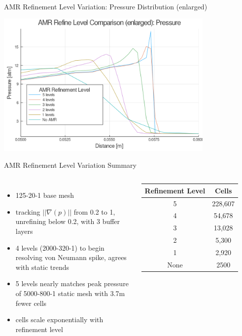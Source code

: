 \begin{frame}{AMR Refinement Level Variation: Pressure Distribution (enlarged)}
\begin{center}
\includegraphics[width=0.8\textwidth]{../figs/amrfigs/amr_refinelevels/pe.png}
\end{center}
\end{frame}


\begin{frame}{AMR Refinement Level Variation Summary}
\begin{columns}
\begin{itemize}
\item 125-20-1 base mesh
\item tracking $||\nabla (p)||$ from 0.2 to 1, unrefining below 0.2, with 3 buffer layers
\item 4 levels (2000-320-1) to begin resolving von Neumann spike, agrees with static trends
\item 5 levels nearly matches peak pressure of 5000-800-1 static mesh with 3.7m fewer cells
\item cells scale exponentially with refinement level
\end{itemize}

\begin{table}[h]
\centering
\begin{tabular}{cc}
Refinement Level & Cells \\ \hline
5 & 228,607 \\ 
4 & 54,678 \\ 
3 & 13,028 \\ 
2 & 5,300 \\
1 & 2,920 \\
None & 2500 \\
\end{tabular}
\end{table}
\end{columns}
\end{frame}

